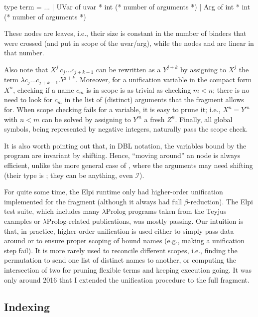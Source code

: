 \documentclass[a4paper, 11pt]{book}
\begin{document}
\begin{ocamlcode}
type term =
  ...
  | UVar of uvar * int (* number of arguments *)
  | Arg  of int  * int (* number of arguments *)
\end{ocamlcode}


\noindent
These nodes are leaves, i.e., their size is constant in the number of binders
that were crossed (and put in scope of the uvar/arg), while the nodes
 and  are linear in that number.


Also note that $X^j\ c_j \ldots c_{j + k-1}$ can be rewritten as a $Y^{j+k}$
by assigning to $X^j$ the term $\lambda c_j \ldots c_{j + k-1}. Y^{j+k}$.
Moreover, for a unification variable in the compact form $X^n$, checking if a
name $c_m$ is in scope is as trivial as checking $m < n$; there is no need to
look for $c_m$ in the list of (distinct) arguments that the \theotherfragment
fragment allows for. When scope checking fails for a variable, it is easy to
prune it; i.e., $X^n = Y^m$ with $n < m$ can be solved by assigning to $Y^m$ a
fresh $Z^n$. Finally, all global symbols, being represented by negative
integers, naturally pass the scope check.


It is also worth pointing out that, in DBL notation, the variables bound by the
program are invariant by shifting. Hence, ``moving around'' an  node
is always efficient, unlike the more general case of , where
the arguments may need shifting (their type is ; they can be
anything, even $\mathcal{I}$).


For quite some time, the Elpi runtime only had higher-order unification
implemented for the \thefragment fragment (although it always had full
$\beta$-reduction). The Elpi test suite, which includes many $\lambda$Prolog
programs taken from the Teyjus examples or $\lambda$Prolog-related
publications, was mostly passing. Our intuition is that, in practice,
higher-order unification is used either to simply pass data around or to
ensure proper scoping of bound names (e.g., making a unification step fail).
It is more rarely used to reconcile different scopes, i.e., finding the
permutation to send one list of distinct names to another, or computing the
intersection of two for pruning flexible terms and keeping execution going.
It was only around 2016 that I extended the unification procedure to the full
\theotherfragment fragment.


\subsection{Indexing}
\end{document}

